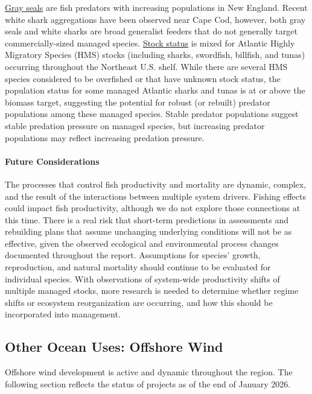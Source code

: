 \documentclass[
  10pt,
]{article}
\begin{document}
\href{https://noaa-edab.github.io/catalog/grayseal.html}{Gray seals} are fish predators with increasing populations in New England. Recent white shark aggregations have been observed near Cape Cod, however, both gray seals and white sharks are broad generalist feeders that do not generally target commercially-sized managed species. \href{https://noaa-edab.github.io/catalog/hms_stock_status.html}{Stock status} is mixed for Atlantic Highly Migratory Species (HMS) stocks (including sharks, swordfish, billfish, and tunas) occurring throughout the Northeast U.S. shelf. While there are several HMS species considered to be overfished or that have unknown stock status, the population status for some managed Atlantic sharks and tunas is at or above the biomass target, suggesting the potential for robust (or rebuilt) predator populations among these managed species. Stable predator populations suggest stable predation pressure on managed species, but increasing predator populations may reflect increasing predation pressure.

\paragraph{Future Considerations}\label{future-considerations-2}

The processes that control fish productivity and mortality are dynamic, complex, and the result of the interactions between multiple system drivers. Fishing effects could impact fish productivity, although we do not explore those connections at this time. There is a real risk that short-term predictions in assessments and rebuilding plans that assume unchanging underlying conditions will not be as effective, given the observed ecological and environmental process changes documented throughout the report. Assumptions for species' growth, reproduction, and natural mortality should continue to be evaluated for individual species. With observations of system-wide productivity shifts of multiple managed stocks, more research is needed to determine whether regime shifts or ecosystem reorganization are occurring, and how this should be incorporated into management.

\subsection{Other Ocean Uses: Offshore Wind}\label{other-ocean-uses-offshore-wind}

Offshore wind development is active and dynamic throughout the region. The following section reflects the status of projects as of the end of January 2026.
\end{document}
